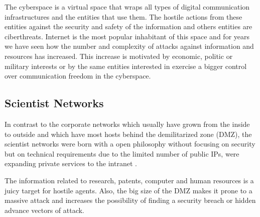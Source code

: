 \documentclass[a4paper]{llncs}
\begin{document}
The cyberspace is a virtual space that wraps all types of digital
communication  infrastructures and the entities that use them. The hostile actions from these entities against the security and safety of the information and others entities are ciberthreats. Internet is the most popular inhabitant of this space and for years we have seen how
the number and complexity of attacks against information and resources has increased. This increase is motivated by  economic, politic or military interests or by the same entities interested in exercise a bigger control over communication freedom in the cyberspace\cite{cni-ccn-tendencias-2014}\cite{cni-ccn-tendencias-2015}.
\subsection{Scientist Networks}
\label{sect:Scientist Networks}
In contrast to the corporate networks which usually have grown from
the inside to outside %
and which have most hosts behind the demilitarized
zone (DMZ), %
the scientist networks were born with a open philosophy without focusing on security but on technical requirements due to the limited number of public IPs, were expanding private services to the intranet \cite{iris-proyecto}.

The information related to research, patents, computer and human resources is a juicy target for hostile agents. Also, the big size of the DMZ %
 makes it prone to a massive attack and increases the possibility of finding a security breach or hidden advance vectors of attack.
\end{document}
